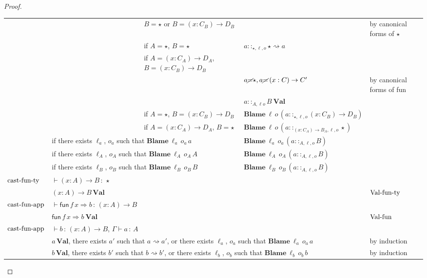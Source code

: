 \begin{proof}
\begin{tabular}{lllll}
 &  & $B=\star$ or $B=\left(x:C_{B}\right)\rightarrow D_{B}$ &  & by canonical forms of $\star$\tabularnewline
 &  & if $A=\star$, $B=\star$  & $a::_{\star,\ensuremath{\ell},o}\star\rightsquigarrow a$ & \tabularnewline
 &  & if $A=\left(x:C_{A}\right)\rightarrow D_{A}$, $B=\left(x:C_{B}\right)\rightarrow D_{B}$ &  & \tabularnewline
 &  &  & $a\cancel{=}\star,a\cancel{=}\left(x:C\right)\rightarrow C'$ & by canonical forms of fun \tabularnewline
 &  &  & $a::_{A,\ensuremath{\ell}o}B\:\textbf{Val}$ & \tabularnewline
 &  & if $A=\star$, $B=\left(x:C_{B}\right)\rightarrow D_{B}$  & $\textbf{Blame}\:\ensuremath{\ell}\,o\,\left(a::_{\star,\ensuremath{\ell},o}\left(x:C_{B}\right)\rightarrow D_{B}\right)$ & \tabularnewline
 &  & if $A=\left(x:C_{A}\right)\rightarrow D_{A}$, $B=\star$ & $\textbf{Blame}\:\ensuremath{\ell}\,o\,\left(a::_{\left(x:C_{A}\right)\rightarrow B_{A},\ensuremath{\ell},o}\star\right)$ & \tabularnewline
 & \multicolumn{2}{l}{if there exists $\ell_{a}$, $o_{a}$ such that $\textbf{Blame}\:\ensuremath{\ell}_{a}\,o_{a}\,a$} & $\textbf{Blame}\:\ensuremath{\ell}_{a}\,o_{a}\,\left(a::_{A,\ensuremath{\ell},o}B\right)$ & \tabularnewline
 & \multicolumn{2}{l}{if there exists $\ell_{A}$, $o_{A}$ such that $\textbf{Blame}\:\ensuremath{\ell}_{A}\,o_{A}\,A$} & $\textbf{Blame}\:\ensuremath{\ell}_{A}\,o_{A}\,\left(a::_{A,\ensuremath{\ell},o}B\right)$ & \tabularnewline
 & \multicolumn{2}{l}{if there exists $\ell_{B}$, $o_{B}$ such that $\textbf{Blame}\:\ensuremath{\ell}_{B}\,o_{B}\,B$} & $\textbf{Blame}\:\ensuremath{\ell}_{B}\,o_{B}\,\left(a::_{A,\ensuremath{\ell},o}B\right)$ & \tabularnewline
$\operatorname{cast-fun-ty}$ & $\vdash\left(x:A\right)\rightarrow B\,:\,\star$ &  &  & \tabularnewline
 & $\left(x:A\right)\rightarrow B\,\textbf{Val}$ &  &  & $\operatorname{Val-fun-ty}$\tabularnewline
$\operatorname{cast-fun-app}$ & $\vdash\mathsf{fun}\,f\,x\Rightarrow b\,:\,\left(x:A\right)\rightarrow B$ &  &  & \tabularnewline
 & $\mathsf{fun}\,f\,x\Rightarrow b\:\textbf{Val}$ &  &  & $\operatorname{Val-fun}$\tabularnewline
$\operatorname{cast-fun-app}$ & \multicolumn{2}{l}{$\vdash b\,:\,\left(x:A\right)\rightarrow B$, $\Gamma\vdash a\,:\,A$} & \tabularnewline
 & \multicolumn{3}{l}{$a\,\textbf{Val}$, there exists $a'$ such that $a\rightsquigarrow a'$,
or there exists $\ell_{a}$, $o_{a}$ such that $\textbf{Blame}\:\ensuremath{\ell}_{a}\,o_{a}\,a$} & by induction\tabularnewline
 & \multicolumn{3}{l}{$b\,\textbf{Val}$, there exists $b'$ such that $b\rightsquigarrow b'$,
or there exists $\ell_{b}$, $o_{b}$ such that $\textbf{Blame}\:\ensuremath{\ell}_{b}\,o_{b}\,b$} & by induction\tabularnewline

\end{tabular}
\end{proof}
